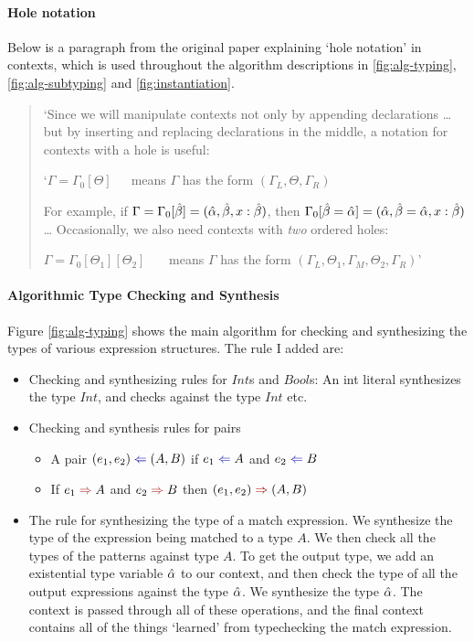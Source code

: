 \paragraph{Hole notation}
Below is a paragraph from the original paper \cite{completebidir} explaining `hole notation' in contexts, which is used throughout the algorithm descriptions in \ref{fig:alg-typing}, \ref{fig:alg-subtyping} and \ref{fig:instantiation}. 
\begin{quote}
`Since we will manipulate contexts not only by appending declarations \dots but by inserting and replacing declarations in the middle, a notation for contexts with a hole is useful:
\vspace{-4pt}
\begin{displ}
  `$\Gamma = \Gamma_0[\Theta]$~~~means $\Gamma$ has the form $(\Gamma_L, \Theta, \Gamma_R)$
\end{displ}
For example, if $\Gamma = \Gamma_0[\hat{\beta}] = (\hat{\alpha}, \hat{\beta}, x : \hat{\beta})$,
then $\Gamma_0[{\hat{\beta}} = {\hat{\alpha}}] = (\hat{\alpha}, {\hat{\beta}} = {\hat{\alpha}}, x : \hat{\beta})$\newline\dots\newline
Occasionally, we also need contexts with \emph{two} ordered holes:
\begin{displ}
  $\Gamma = \Gamma_0[\Theta_1][\Theta_2]$
  ~~~means
  $\Gamma$ has the form $(\Gamma_L, \Theta_1, \Gamma_M, \Theta_2, \Gamma_R)$' \cite{completebidir}
\end{displ}
\end{quote}

\pagebreak


\paragraph{Algorithmic Type Checking and Synthesis} Figure \ref{fig:alg-typing} shows the main algorithm for checking and synthesizing the types of various expression structures. The rule I added are:
\begin{itemize}
    \item Checking and synthesizing rules for $Int$s and $Bool$s: An int literal synthesizes the type $Int$, and checks against the type $Int$ etc.
    \item Checking and synthesis rules for pairs
    \begin{itemize}
        \item A pair $(e_1, e_2) \chk (A, B)$ if $e_1 \chk A$ and $e_2 \chk B$
        \item If $e_1 \syn A$ and $e_2 \syn B$ then $(e_1, e_2) \syn (A, B)$
    \end{itemize}
    \item The rule for synthesizing the type of a match expression. We synthesize the type of the expression being matched to a type $A$. We then check all the types of the patterns against type $A$. To get the output type, we add an existential type variable $\hat{\alpha}$ to our context, and then check the type of all the output expressions against the type $\hat{\alpha}$. We synthesize the type $\hat{\alpha}$. The context is passed through all of these operations, and the final context contains all of the things `learned' from typechecking the match expression.
\end{itemize}

